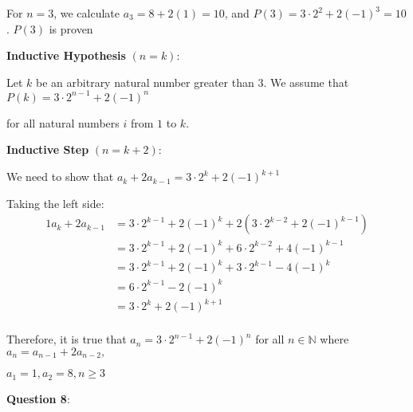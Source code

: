 \documentclass{article} %
\newcommand{\question}[2][]{\begin{flushleft}
        \textbf{Question #1}: \text{#2}

\end{flushleft}}
\begin{document}
    For $n = 3$, we calculate $a_3 = 8 + 2(1) = 10$, and $P(3) = 3 \cdot 2^2 + 2(-1)^3 = 10$. $P(3)$ is proven

    \textbf{Inductive Hypothesis} $(n = k)$:

    Let $k$ be an arbitrary natural number greater than 3. We assume that $P(k) = 3 \cdot 2^{n - 1} + 2(-1)^n$

    for all natural numbers $i$ from $1$ to $k$.

    \textbf{Inductive Step} $(n = k + 2)$:

    We need to show that $a_{k} + 2a_{k - 1} = 3 \cdot 2^{k} + 2(-1)^{k + 1}$

    Taking the left side:
    \begin{alignat*}{1}
        a_{k} + 2a_{k - 1} &= 3 \cdot 2^{k - 1} + 2(-1)^k + 2(3 \cdot 2^{k - 2} + 2(-1)^{k - 1})\\
        &= 3 \cdot 2^{k - 1} + 2(-1)^k + 6 \cdot 2^{k - 2} + 4(-1)^{k - 1}\\
        &= 3 \cdot 2^{k - 1} + 2(-1)^{k} + 3 \cdot 2^{k - 1} - 4(-1)^{k}\\
        &= 6 \cdot 2^{k - 1} - 2(-1)^{k}\\
        &= 3 \cdot 2^{k} + 2(-1)^{k + 1}\\
    \end{alignat*}

    Therefore, it is true that $a_n = 3 \cdot 2^{n - 1} + 2(-1)^n$ for all $n \in \mathbb{N}$ where $a_n = a_{n - 1} + 2a_{n-2},$
    
    $a_1 = 1, a_2 = 8, n \geq 3$

    \question[8]{}
\end{document}
